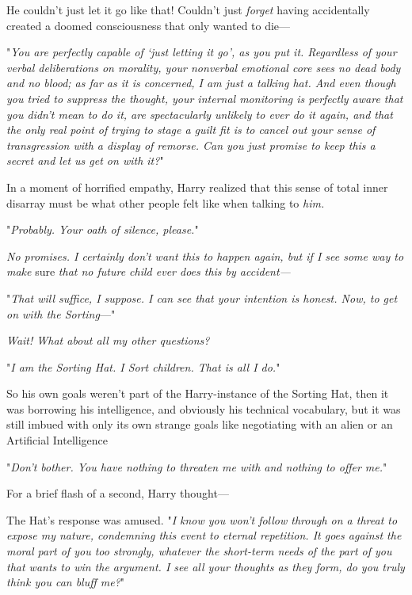 He couldn't just let it go like that! Couldn't just \emph{forget} having
accidentally created a doomed consciousness that only wanted to die---

"\emph{You are perfectly capable of `just letting it go', as you put it.
Regardless of your verbal deliberations on morality, your nonverbal emotional
core sees no dead body and no blood; as far as it is concerned, I am just a
talking hat. And even though you tried to suppress the thought, your internal
monitoring is perfectly aware that you didn't mean to do it, are spectacularly
unlikely to ever do it again, and that the only real point of trying to stage a
guilt fit is to cancel out your sense of transgression with a display of
remorse. Can you just promise to keep this a secret and let us get on with it?}"

In a moment of horrified empathy, Harry realized that this sense of total inner
disarray must be what other people felt like when talking to \emph{him.}

"\emph{Probably. Your oath of silence, please.}"

\emph{No promises. I certainly don't want this to happen again, but if I see
some way to make} sure \emph{that no future child ever does this by accident---}

"\emph{That will suffice, I suppose. I can see that your intention is honest.
Now, to get on with the Sorting}\mbox{---}"

\emph{Wait! What about all my other questions?}

"\emph{I am the Sorting Hat. I Sort children. That is all I do.}"

So his own goals weren't part of the Harry-instance of the Sorting Hat,
then{\el} it was borrowing his intelligence, and obviously his technical
vocabulary, but it was still imbued with only its own strange goals{\el}
like negotiating with an alien or an Artificial Intelligence{\el}

"\emph{Don't bother. You have nothing to threaten me with and nothing to offer
me.}"

For a brief flash of a second, Harry thought---

The Hat's response was amused. "\emph{I know you won't follow through on a
threat to expose my nature, condemning this event to eternal repetition. It
goes against the moral part of you too strongly, whatever the short-term needs
of the part of you that wants to win the argument. I see all your thoughts as
they form, do you truly think you can bluff me?}"

